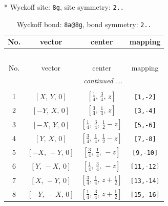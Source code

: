 \documentclass[fleqn,8pt]{jsarticle}
\begin{document}
* Wyckoff site: {\tt 8g}, site symmetry: {\tt 2..}
\renewcommand{\arraystretch}{1.2}
\begin{longtable}{cccc}
\caption{Wyckoff bond: {\tt 8a@8g}, bond symmetry: {\tt 2..}}
 \\
 \hline \hline
No. & vector & center & mapping \\ \hline \endfirsthead

\multicolumn{3}{l}{\tablename\ \thetable{}} \\
 \hline \hline
No. & vector & center & mapping \\ \hline \endhead

 \hline \hline
\multicolumn{3}{r}{\footnotesize\it continued ...} \\ \endfoot

 \hline \hline
\multicolumn{3}{r}{} \\ \endlastfoot

1 & $\left[ X,\, Y,\, 0 \right]$ & $\left[ \frac{1}{4},\, \frac{3}{4},\, z \right]$ & {\tt [1,-2]} \\ \hline
2 & $\left[ - Y,\, X,\, 0 \right]$ & $\left[ \frac{3}{4},\, \frac{1}{4},\, z \right]$ & {\tt [3,-4]} \\ \hline
3 & $\left[ - X,\, Y,\, 0 \right]$ & $\left[ \frac{1}{4},\, \frac{3}{4},\, \frac{1}{2} - z \right]$ & {\tt [5,-6]} \\ \hline
4 & $\left[ Y,\, X,\, 0 \right]$ & $\left[ \frac{3}{4},\, \frac{1}{4},\, \frac{1}{2} - z \right]$ & {\tt [7,-8]} \\ \hline
5 & $\left[ - X,\, - Y,\, 0 \right]$ & $\left[ \frac{3}{4},\, \frac{1}{4},\, - z \right]$ & {\tt [9,-10]} \\ \hline
6 & $\left[ Y,\, - X,\, 0 \right]$ & $\left[ \frac{1}{4},\, \frac{3}{4},\, - z \right]$ & {\tt [11,-12]} \\ \hline
7 & $\left[ X,\, - Y,\, 0 \right]$ & $\left[ \frac{3}{4},\, \frac{1}{4},\, z + \frac{1}{2} \right]$ & {\tt [13,-14]} \\ \hline
8 & $\left[ - Y,\, - X,\, 0 \right]$ & $\left[ \frac{1}{4},\, \frac{3}{4},\, z + \frac{1}{2} \right]$ & {\tt [15,-16]} \\
\end{longtable}
\renewcommand{\arraystretch}{1.2}
\end{document}
